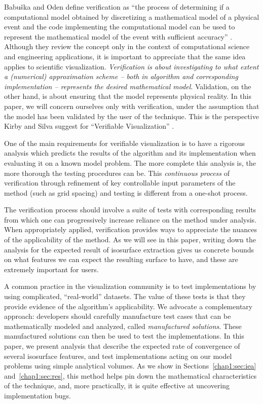 Babu\v{s}ka and Oden define verification as ``the process of determining
if a computational model obtained by discretizing a mathematical model
of a physical event and the code implementing the computational model
can be used to represent the mathematical model of the event with
sufficient accuracy'' \cite{babuska04}.  Although they review the concept 
only in the context of computational science and engineering applications, 
it is important to appreciate that the same idea applies to
scientific visualization. \emph{Verification is about investigating to
what extent a (numerical) approximation scheme -- both in algorithm
and corresponding implementation -- represents the desired mathematical
model}. Validation, on the other hand, is about ensuring that the
model represents physical reality. In this paper, we will concern
ourselves only with verification, under the assumption that the 
model has been validated by the user of the technique. This is the
perspective Kirby and Silva suggest for ``Verifiable Visualization''
\cite{kirby-vv-08}.

One of the main requirements for verifiable visualization is to have 
a rigorous analysis which predicts the results of the algorithm and
its implementation when evaluating it on a known model problem.  The
more complete this analysis is, the more thorough the testing procedures
can be. This \emph{continuous process} of verification through refinement
of key controllable input parameters of the method (such as grid spacing) 
and testing is different from a one-shot process.

The verification process should involve a suite of tests with
corresponding results from which one can
progressively increase reliance on the method under analysis. 
When appropriately applied, verification 
provides ways to appreciate the nuances of the applicability of the
method. As we will see in this paper, writing down the analysis for the
expected result of isosurface extraction gives us concrete
bounds on what features we can expect the resulting surface to have,
and these are extremely important for users.


A common practice in the visualization community is to test
implementations by using complicated, ``real-world'' datasets. The
value of these tests is that they provide evidence of the algorithm's applicability. We
advocate a complementary approach: developers should carefully
manufacture test cases that can be mathematically modeled and
analyzed, called \emph{manufactured solutions}. These manufactured
solutions can then be used to test the implementations. In this paper, we present
analysis that describe the expected rate of convergence of several
isosurface features, and test implementations acting on our model problems
using simple analytical volumes. As we show in Sections~\ref{chap1:sec:iea} 
and~\ref{chap1:sec:res}, this method helps pin down the mathematical characteristics 
of the technique, and, more practically, it is quite effective at uncovering 
implementation bugs.

